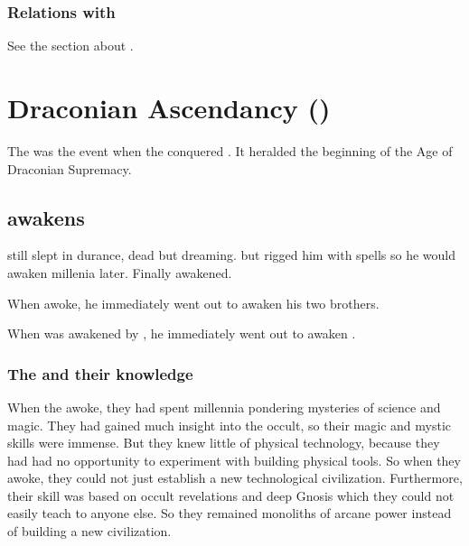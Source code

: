 \subsubsection{Relations with \nephilim}
See the section about . 












\section{Draconian Ascendancy ()}
The  was the event when the \dragons conquered \Miith. 
It heralded the beginning of the Age of Draconian Supremacy. 









\subsection{\Nexagglachel awakens}
\Nexagglachel still slept in durance, dead but dreaming.
\Sethicus {} but rigged him with spells so he would awaken millenia later. 
Finally \Nexagglachel awakened. 

When \Nexagglachel awoke, he immediately went out to awaken his two brothers.

When \Ishnaruchaefir was awakened by \Nexagglachel, he immediately went out to awaken \Rystessakhin. 





\subsubsection{The \dragons and their knowledge}
When the \dragons awoke, they had spent millennia pondering mysteries of science and magic. 
They had gained much insight into the occult, so their magic and mystic skills were immense. 
But they knew little of physical technology, because they had had no opportunity to experiment with building physical tools. 
So when they awoke, they could not just establish a new technological civilization. 
Furthermore, their skill was based on occult revelations and deep Gnosis which they could not easily teach to anyone else. 
So they remained monoliths of arcane power instead of building a new civilization. 

